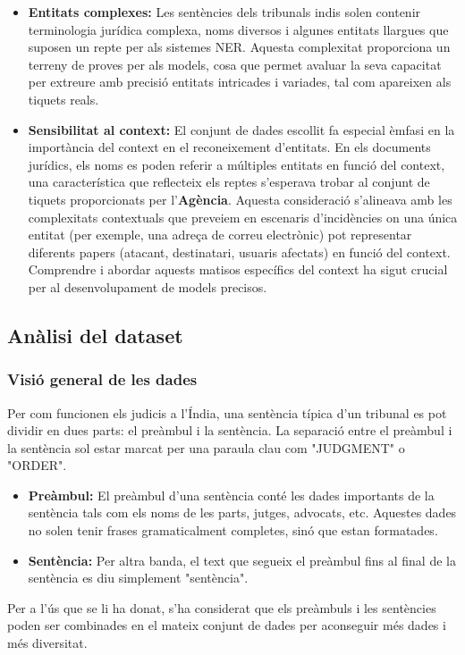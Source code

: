 \begin{itemize}
  \item \textbf{Entitats complexes:} Les sentències dels tribunals indis solen contenir terminologia jurídica complexa, noms diversos i algunes entitats llargues que suposen un repte per als sistemes NER. Aquesta complexitat proporciona un terreny de proves per als models, cosa que permet avaluar la seva capacitat per extreure amb precisió entitats intricades i variades, tal com apareixen als tiquets reals.
  \item \textbf{Sensibilitat al context:} El conjunt de dades escollit fa especial èmfasi en la importància del context en el reconeixement d'entitats. En els documents jurídics, els noms es poden referir a múltiples entitats en funció del context, una característica que reflecteix els reptes s'esperava trobar al conjunt de tiquets proporcionats per l'\textbf{Agència}. Aquesta consideració s'alineava amb les complexitats contextuals que preveiem en escenaris d'incidències on una única entitat (per exemple, una adreça de correu electrònic) pot representar diferents papers (atacant, destinatari, usuaris afectats) en funció del context. Comprendre i abordar aquests matisos específics del context ha sigut crucial per al desenvolupament de models precisos.
\end{itemize}


\subsection{Anàlisi del dataset}

\subsubsection{Visió general de les dades}
Per com funcionen els judicis a l'Índia, una sentència típica d'un tribunal es pot dividir en dues parts: el preàmbul i la sentència. La separació entre el preàmbul i la sentència sol estar marcat per una paraula clau com "JUDGMENT" o "ORDER". 
\begin{itemize}
  \item \textbf{Preàmbul:} El preàmbul d'una sentència conté les dades importants de la sentència tals com els noms de les parts, jutges, advocats, etc. Aquestes dades no solen tenir frases gramaticalment completes, sinó que estan formatades.
  \item \textbf{Sentència:} Per altra banda, el text que segueix el preàmbul fins al final de la sentència es diu simplement "sentència".
\end{itemize}
Per a l'ús que se li ha donat, s'ha considerat que els preàmbuls i les sentències poden ser combinades en el mateix conjunt de dades per aconseguir més dades i més diversitat.

